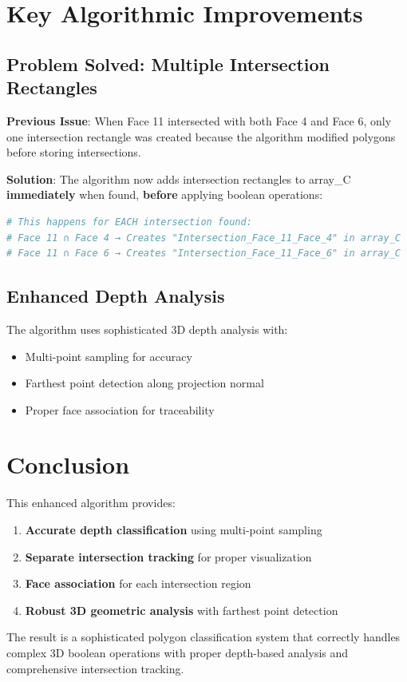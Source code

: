 \documentclass[12pt,a4paper]{article}
\begin{document}
\section{Key Algorithmic Improvements}

\subsection{Problem Solved: Multiple Intersection Rectangles}

\textbf{Previous Issue}: When Face 11 intersected with both Face 4 and Face 6, only one intersection rectangle was created because the algorithm modified polygons before storing intersections.

\textbf{Solution}: The algorithm now adds intersection rectangles to array\_C \textbf{immediately} when found, \textbf{before} applying boolean operations:

\begin{lstlisting}[language=Python]
# This happens for EACH intersection found:
# Face 11 ∩ Face 4 → Creates "Intersection_Face_11_Face_4" in array_C
# Face 11 ∩ Face 6 → Creates "Intersection_Face_11_Face_6" in array_C
\end{lstlisting}

\subsection{Enhanced Depth Analysis}

The algorithm uses sophisticated 3D depth analysis with:
\begin{itemize}
    \item Multi-point sampling for accuracy
    \item Farthest point detection along projection normal
    \item Proper face association for traceability
\end{itemize}

\section{Conclusion}

This enhanced algorithm provides:
\begin{enumerate}
    \item \textbf{Accurate depth classification} using multi-point sampling
    \item \textbf{Separate intersection tracking} for proper visualization
    \item \textbf{Face association} for each intersection region
    \item \textbf{Robust 3D geometric analysis} with farthest point detection
\end{enumerate}

The result is a sophisticated polygon classification system that correctly handles complex 3D boolean operations with proper depth-based analysis and comprehensive intersection tracking.
\end{document}
